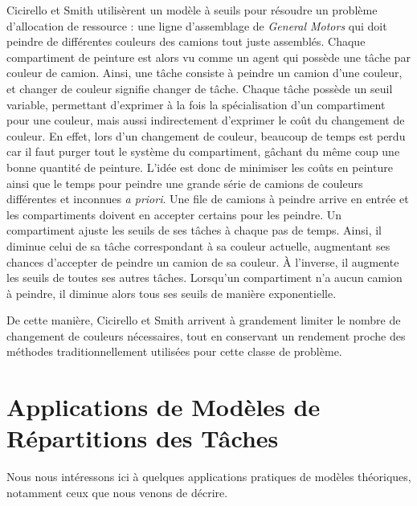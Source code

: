         Cicirello et Smith \cite{cicirello_wasp-like_2004} utilisèrent un modèle à seuils pour résoudre un problème d'allocation de ressource : une ligne d'assemblage de \textit{General Motors} qui doit peindre de différentes couleurs des camions tout juste assemblés. Chaque compartiment de peinture est alors vu comme un agent qui possède une tâche par couleur de camion. Ainsi, une tâche consiste à peindre un camion d'une couleur, et changer de couleur signifie changer de tâche. Chaque tâche possède un seuil variable, permettant d'exprimer à la fois la spécialisation d'un compartiment pour une couleur, mais aussi indirectement d'exprimer le coût du changement de couleur. En effet, lors d'un changement de couleur, beaucoup de temps est perdu car il faut purger tout le système du compartiment, gâchant du même coup une bonne quantité de peinture. L'idée est donc de minimiser les coûts en peinture ainsi que le temps pour peindre une grande série de camions de couleurs différentes et inconnues \textit{a priori}. Une file de camions à peindre arrive en entrée et les compartiments doivent en accepter certains pour les peindre. Un compartiment ajuste les seuils de ses tâches à chaque pas de temps. Ainsi, il diminue celui de sa tâche correspondant à sa couleur actuelle, augmentant ses chances d'accepter de peindre un camion de sa couleur. À l'inverse, il augmente les seuils de toutes ses autres tâches. Lorsqu'un compartiment n'a aucun camion à peindre, il diminue alors tous ses seuils de manière exponentielle.
        
        De cette manière, Cicirello et Smith arrivent à grandement limiter le nombre de changement de couleurs nécessaires, tout en conservant un rendement proche des méthodes traditionnellement utilisées pour cette classe de problème.
        
        
        \section{Applications de Modèles de Répartitions des Tâches}
        \label{sectionAppli}
        Nous nous intéressons ici à quelques applications pratiques de modèles théoriques, notamment ceux que nous venons de décrire. 
        
